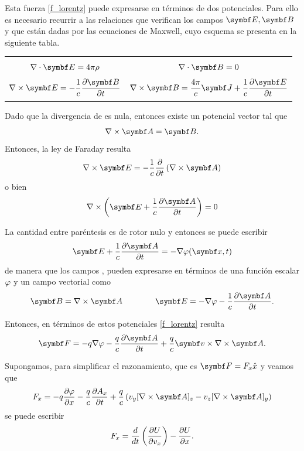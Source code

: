 \documentclass[10pt,oneside]{CBFT_book}
\begin{document}
Esta fuerza \eqref{f_lorentz} puede expresarse en términos de dos potenciales. Para ello es necesario recurrir a
las relaciones que verifican los campos $\vb{E}, \vb{B}$ y que están dadas por las ecuaciones de Maxwell, cuyo esquema 
se presenta en la siguiente tabla.
\begin{center}
\begin{tabular}{|c|c|}
\hline
& \\
$ \nabla\cdot\vb{E} = 4 \pi \rho $ & $ \nabla \cdot \vb{B} = 0 $ \\
& \\
$ \displaystyle \rotorm{E} = -\frac{1}{c} \dpar{\vb{B}}{t} $ &  
$ \displaystyle \rotorm{B} = \frac{4\pi}{c}\vb{J} + \frac{1}{c} \dpar{\vb{E}}{t} $ \\
 & \\
\hline
\end{tabular}
\end{center}

Dado que la divergencia de  es nula, entonces existe un potencial vector  tal que 
\[
	\rotorm{A} = \vb{B}.
\]
Entonces, la ley de Faraday resulta 
\[
	\rotorm{E} = -\frac{1}{c} \dpar{}{t} \left(\rotorm{A} \right) 
\]
o bien 
\[
	\nabla\times\left( \vb{E} + \frac{1}{c}\dpar{\vb{A}}{t} \right) = 0
\]

La cantidad entre paréntesis es de rotor nulo y entonces se puede escribir
\[
	\vb{E} + \frac{1}{c}\dpar{\vb{A}}{t} = -\nabla \vp( \vb{x}, t )
\]
de manera que los campos ,  pueden expresarse en términos de una función escalar $\varphi$ y un campo vectorial
 como
\[
	\vb{B} = \rotorm{A} \qquad \qquad \vb{E} = - \nabla \vp - \frac{1}{c} \dpar{ \vb{A} }{t} .
\]

Entonces, en términos de estos potenciales \eqref{f_lorentz} resulta 
\[
	\vb{F} = -q\nabla \vp - \frac{q}{c} \dpar{ \vb{A} }{t} + \frac{q}{c} \vb{v} \times \rotorm{A}.
\]

Supongamos, para simplificar el razonamiento, que es $ \vb{F} = F_x \hat{x} $ y veamos que 
\[
	F_x = -q \dpar{ \vp }{ x } - \frac{q}{c} \dpar{ A_x }{t} + \frac{q}{c} \left( v_y [\rotorm{A}]_z - v_z [\rotorm{A}]_y \right)
\]
se puede escribir
\[
	F_x = \frac{d^{\hspace{-0.05em}} {}}{d {t}^{\hspace{-0.05em}}} \left( \frac{\partial^{\hspace{-0.05em}} {U}}{\partial {v_x}^{\hspace{-0.05em}}} \right)  -\frac{\partial^{\hspace{-0.05em}} {U}}{\partial {x}^{\hspace{-0.05em}}}.
\]
\end{document}
